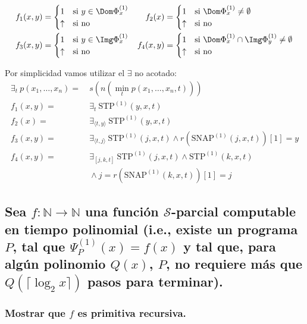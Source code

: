 \documentclass[fleqn, 11pt]{article}
\newcommand{\nat}{\mathbb{N}}
\newcommand{\Scur}{\mathcal{S}}
\newcommand{\indef}{\uparrow}
\newcommand{\STP}[1][n]{\text{STP}^{(#1)}}
\newcommand{\SNAP}[1][n]{\text{SNAP}^{(#1)}}
\begin{document}
\begin{align*}
	f_1(x, y) &=
	\begin{cases}
		1      & \text{si } y \in \Dom \Phi^{(1)}_x \\
		\indef & \text{si no}
	\end{cases} &
	f_2(x) &=
	\begin{cases}
		1      & \text{si } \Dom \Phi^{(1)}_x \neq \emptyset \\
		\indef & \text{si no}
	\end{cases} \\
	f_3(x, y) &=
	\begin{cases}
		1      & \text{si } y \in \Img \Phi^{(1)}_x \\
		\indef & \text{si no}
	\end{cases} &
	f_4(x, y) &=
	\begin{cases}
		1      & \text{si } \Dom \Phi^{(1)}_x \cap \Img \Phi^{(1)}_y
		                    \neq \emptyset \\
		\indef & \text{si no}
	\end{cases}
\end{align*}

Por simplicidad vamos utilizar el $\exists$ no acotado:
\begin{align*}
	\exists_t\ p(x_1, \dots, x_n) =&\ s(n(\min_t p(x_1, \dots, x_n, t))) \\
	f_1(x, y) =&\ \exists_t\ \STP[1](y, x, t) \\
	f_2(x)    =&\ \exists_{\langle t, y \rangle}\ \STP[1](y, x, t) \\
	f_3(x, y) =&\ \exists_{\langle t, j \rangle}\ \STP[1](j, x, t)
		\land r(\SNAP[1](j, x, t))[1] = y \\
	f_4(x, y) =&\ \exists_{[j, k, t]}\ \STP[1](j, x, t)
		\land \STP[1](k, x, t) \\
		&\ \land j = r(\SNAP[1](k, x, t))[1] = j
\end{align*}

\subsection{Sea $f: \nat \to \nat$ una función $\Scur$-parcial computable en
tiempo polinomial (i.e., existe un programa $P$, tal que $\Psi^{(1)}_P(x) =
f(x)$ y tal que, para algún polinomio $Q(x)$, $P$, no requiere más que
$Q(\lceil \log_2 x \rceil)$ pasos para terminar).}

\subsubsection{Mostrar que $f$ es primitiva recursiva.}
\end{document}
